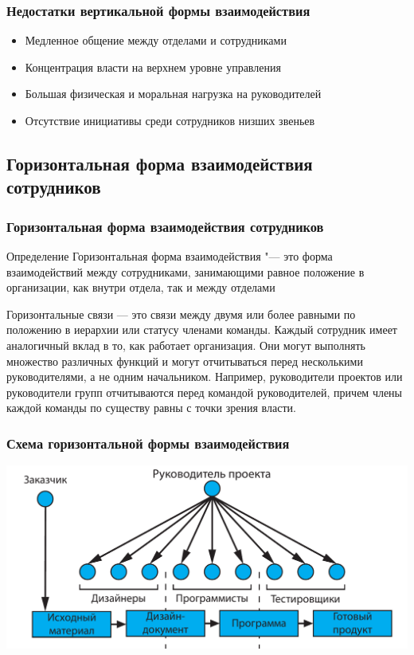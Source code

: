 \documentclass{../industrial-development}
\begin{document}
\begin{frame} \frametitle{Недостатки вертикальной формы взаимодействия}
  
  \begin{itemize}
  \item Медленное общение между отделами и сотрудниками
  \item Концентрация власти на верхнем уровне управления
  \item Большая физическая и моральная нагрузка на руководителей
  \item Отсутствие инициативы среди сотрудников низших звеньев
  \end{itemize}
\end{frame}

\subsection{Горизонтальная форма взаимодействия сотрудников}

\begin{frame} \frametitle{Горизонтальная форма взаимодействия сотрудников}
  \begin{block}{Определение}
\alert{Горизонтальная форма взаимодействия} "--- это форма взаимодействий между сотрудниками, занимающими равное положение в организации, как внутри отдела, так и между отделами
  \end{block}
\end{frame}

\lecturenotes
Горизонтальные связи — это связи между двумя или более равными по положению в иерархии или статусу членами команды. Каждый сотрудник имеет аналогичный вклад в то, как работает организация. Они могут выполнять множество различных функций и могут отчитываться перед несколькими руководителями, а не одним начальником. Например, руководители проектов или руководители групп отчитываются перед командой руководителей, причем члены каждой команды по существу равны с точки зрения власти.

\begin{frame} \frametitle{Схема горизонтальной формы взаимодействия}
  \begin{block}{}
\centerline{\includegraphics[width=1\textwidth]{horizontal.pdf}}
  \end{block}
\end{frame}
\end{document}
